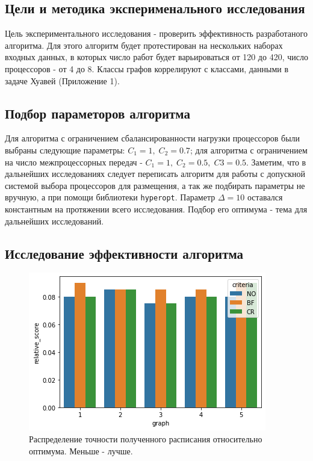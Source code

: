 \subsection{Цели и методика эксперименального исследования}
Цель экспериментального исследования - проверить эффективность разработаного алгоритма. Для этого алгоритм будет протестирован на нескольких наборах входных данных,  в которых число работ будет варьироваться от 120 до 420, число процессоров - от 4 до 8. Классы графов коррелируют с классами, данными в задаче Хуавей (Приложение 1).

\subsection{Подбор параметоров алгоритма}
Для алгоритма с ограничением сбалансированности нагрузки процессоров были выбраны следующие параметры: $C_1 = 1,\;C_2=0.7$; для алгоритма с ограничением на число межпроцессорных передач - $C_1 = 1,\;C_2 = 0.5,\;C3=0.5$. Заметим, что в дальнейших исследованиях следует переписать алгоритм для работы с допускной системой выбора процессоров для размещения, а так же подбирать параметры не вручную, а при помощи библиотеки \lstinline{hyperopt}. Параметр $\Delta = 10$ оставался константным на протяжении всего исследования. Подбор его оптимума - тема для дальнейших исследований.

\subsection{Исследование эффективности алгоритма}

\begin{figure}[H]
    \includegraphics{imgs/relative_score.png}
    \caption{Распределение точности полученного расписания относительно оптимума. Меньше - лучше.}
    \label{pic:relative_score}
\end{figure}

